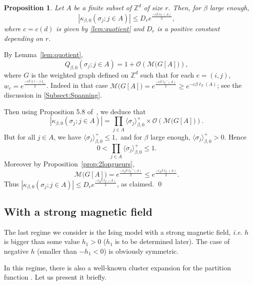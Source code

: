 \documentclass{amsart}
\newcommand{\field}[1]{\mathbb{#1}}
\newcommand{\Z}{\field{Z}}
\def\O{\mathcal{O}}
\newcommand{\MWST}[1]{\mathcal{M} \big( #1 \big)}
\newcommand{\dist}[2]{\|#1 - #2\|_1}
\numberwithin{equation}{section}
\newtheorem{proposition}[theorem]{Proposition}
\theoremstyle{remark}
\renewenvironment{proof}[1][Proof]{\begin{trivlist}
\item[\hskip \labelsep {\bfseries #1:}]}{\qed\end{trivlist}}
\begin{document}
\begin{proposition}
\label{prop:boundcum}
Let $A$ be a finite subset of $\Z^d$ of size $r$. Then, for $\beta$ large enough,
$$|\kappa_{\beta,0} \left(\sigma_j; j \in A \right)| 
\leq D_r e^{\frac{-c \beta \ell_T(A)}{2}},$$
where $c=c(d)$ is given by \cref{lem:quotient}
and $D_r$ is a positive constant depending on $r$.
\end{proposition}
\begin{proof}
By Lemma~\ref{lem:quotient},
$$ Q_{\beta,0} \left(\sigma_j; j \in A \right) = 1+ \O(\MWST{G[A]}),$$
where $G$ is the weighted graph defined on $\Z^d$ such that for each $e=(i,j)$, $w_e = e^{\frac{-c \beta \dist{i}{j}}{2}}$. Indeed in that case $\MWST{G[A]} = e^{\frac{-c \beta \ell_T'(A)}{2}} \geq e^{-c \beta \ell_T(A)}$; see the discussion in \cref{Subsect:Spanning}.

Then using Proposition 5.8 of~\cite{Valentin}, we deduce that
$$|\kappa_{\beta,0} \left(\sigma_j; j \in A \right)| = \prod_{j \in A} \langle\sigma_j\rangle_{\beta,0}^+ \times \O(\MWST{G[A]}).$$
But for all $j \in A$, we have
$\langle \sigma_j \rangle_{\beta,0}^+ \leq 1,$
and  for $\beta$ large enough, $\langle \sigma_j \rangle_{\beta,0}^+ > 0.$
Hence
$$0 < \prod_{j \in A} \langle \sigma_j \rangle_{\beta,0}^+ \leq 1.$$
Moreover by Proposition~\ref{prop:2longueurs},
$$\MWST{G[A]} = e^{\frac{-c_d \beta \ell_T'(A)}{2}} \leq e^{\frac{-c_d \beta \ell_T(A)}{2}}.$$
Thus
$|\kappa_{\beta,0} \left( \sigma_j; j \in A \right)| \leq D_r  e^{\frac{-c_d \beta \ell_T(A)}{2}}$, as claimed.
\end{proof}






\subsection{With a strong magnetic field}
\label{SectBoundMF}
The last regime we consider is the Ising model with a strong magnetic field,
{\em i.e.} $h$ is bigger than some value $h_1>0$ ($h_1$ is to be determined later).
The case of negative $h$ (smaller than $-h_1<0$) is obviously symmetric.


In this regime, there is also a well-known cluster expansion for the partition function \cite[Section 5.7]{Velenik}.
Let us present it briefly.
\end{document}
